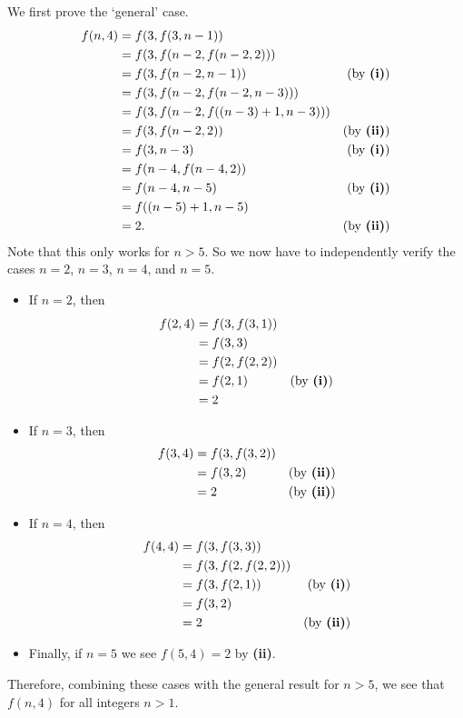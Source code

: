 \begin{questions}
\begin{partquestions}{\roman*}
        \item We first prove the `general' case.
        \begin{align*}
            f(n, 4) &= f(3, f(3, n-1))\\
            &= f(3, f(n-2, f(n-2, 2)))\\
            &= f(3, f(n-2, n-1)) & (\text{by \textbf{(i)}})\\
            &= f(3, f(n-2, f(n-2, n-3)))\\
            &= f(3, f(n-2, f((n-3)+1, n-3)))\\
            &= f(3, f(n-2, 2)) & (\text{by \textbf{(ii)}})\\
            &= f(3, n-3) & (\text{by \textbf{(i)}})\\
            &= f(n-4, f(n-4, 2))\\
            &= f(n-4, n-5) & (\text{by \textbf{(i)}})\\
            &= f((n-5)+1, n-5)\\
            &= 2. & (\text{by \textbf{(ii)}})
        \end{align*}
        Note that this only works for $n > 5$. So we now have to independently verify the cases $n = 2$, $n = 3$, $n = 4$, and $n = 5$.
        \begin{itemize}
            \item If $n = 2$, then
            \begin{align*}
                f(2, 4) &= f(3, f(3, 1))\\
                &= f(3, 3)\\
                &= f(2, f(2, 2))\\
                &= f(2, 1) & (\text{by \textbf{(i)}})\\
                &= 2
            \end{align*}
            \item If $n = 3$, then
            \begin{align*}
                f(3, 4) &= f(3, f(3, 2))\\
                &= f(3, 2) & (\text{by \textbf{(ii)}})\\
                &= 2 & (\text{by \textbf{(ii)}})
            \end{align*}
            \item If $n = 4$, then
            \begin{align*}
                f(4, 4) &= f(3, f(3, 3))\\
                &= f(3, f(2, f(2, 2)))\\
                &= f(3, f(2, 1)) & (\text{by \textbf{(i)}})\\
                &= f(3, 2)\\
                &= 2 & (\text{by \textbf{(ii)}})
            \end{align*}
            \item Finally, if $n = 5$ we see $f(5, 4) = 2$ by \textbf{(ii)}.
        \end{itemize}
        Therefore, combining these cases with the general result for $n > 5$, we see that $f(n, 4)$ for all integers $n > 1$.
    \end{partquestions}
\end{questions}
